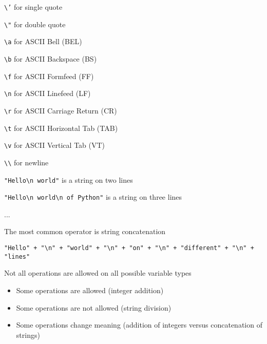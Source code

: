 \documentclass{beamer}
\newcommand{\ts}{\textbackslash}
\begin{document}
\begin{slide}{
\small
\item \texttt{\textbackslash '} for single quote
\item \texttt{\textbackslash "} for double quote
\item \texttt{\textbackslash a} for ASCII Bell (BEL)  
\item \texttt{\textbackslash b} for ASCII Backspace (BS)  
\item \texttt{\textbackslash f} for ASCII Formfeed (FF)  
\item \texttt{\textbackslash n} for ASCII Linefeed (LF)  
\item \texttt{\textbackslash r} for ASCII Carriage Return (CR)  
\item \texttt{\textbackslash t} for ASCII Horizontal Tab (TAB)  
\item \texttt{\textbackslash v} for ASCII Vertical Tab (VT) 
\item \texttt{\textbackslash \textbackslash} for newline
}\end{slide}

\begin{slide}{
\item \texttt{"Hello\ts n world"} is a string on two lines
\item \texttt{"Hello\ts n world\ts n of Python"} is a string on three lines
\item ...
}\end{slide}

\begin{slide}{
\item The most common operator is string concatenation
\item \texttt{"Hello" + "\ts n" + "world" + "\ts n" + "on" + "\ts n" + "different" + "\ts n" + "lines"}
}\end{slide}


\begin{slide}{
\item Not all operations are allowed on all possible variable types
\begin{itemize}
\item Some operations are allowed (integer addition)
\item Some operations are not allowed (string division)
\item Some operations change meaning (addition of integers versus concatenation of strings)
\end{itemize}
}\end{slide}
\end{document}
